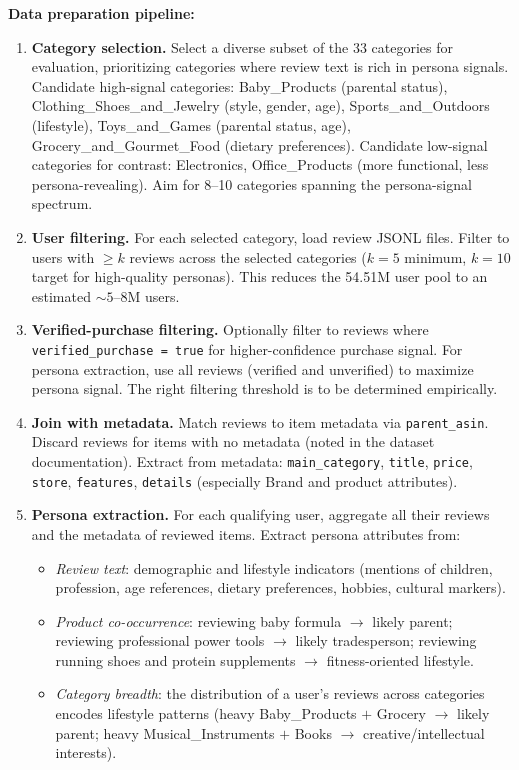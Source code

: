 \medskip\noindent\textbf{Data preparation pipeline:}
\begin{enumerate}
    \item \textbf{Category selection.} Select a diverse subset of the 33 categories for evaluation, prioritizing categories where review text is rich in persona signals. Candidate high-signal categories: Baby\_Products (parental status), Clothing\_Shoes\_and\_Jewelry (style, gender, age), Sports\_and\_Outdoors (lifestyle), Toys\_and\_Games (parental status, age), Grocery\_and\_Gourmet\_Food (dietary preferences). Candidate low-signal categories for contrast: Electronics, Office\_Products (more functional, less persona-revealing). Aim for 8--10 categories spanning the persona-signal spectrum.
    \item \textbf{User filtering.} For each selected category, load review JSONL files. Filter to users with $\geq k$ reviews across the selected categories ($k = 5$ minimum, $k = 10$ target for high-quality personas). This reduces the 54.51M user pool to an estimated ${\sim}5$--8M users.
    \item \textbf{Verified-purchase filtering.} Optionally filter to reviews where \texttt{verified\_purchase = true} for higher-confidence purchase signal. For persona extraction, use all reviews (verified and unverified) to maximize persona signal. The right filtering threshold is to be determined empirically.
    \item \textbf{Join with metadata.} Match reviews to item metadata via \texttt{parent\_asin}. Discard reviews for items with no metadata (noted in the dataset documentation). Extract from metadata: \texttt{main\_category}, \texttt{title}, \texttt{price}, \texttt{store}, \texttt{features}, \texttt{details} (especially Brand and product attributes).
    \item \textbf{Persona extraction.} For each qualifying user, aggregate all their reviews and the metadata of reviewed items. Extract persona attributes from:
    \begin{itemize}
        \item \emph{Review text}: demographic and lifestyle indicators (mentions of children, profession, age references, dietary preferences, hobbies, cultural markers).
        \item \emph{Product co-occurrence}: reviewing baby formula $\to$ likely parent; reviewing professional power tools $\to$ likely tradesperson; reviewing running shoes and protein supplements $\to$ fitness-oriented lifestyle.
        \item \emph{Category breadth}: the distribution of a user's reviews across categories encodes lifestyle patterns (heavy Baby\_Products $+$ Grocery $\to$ likely parent; heavy Musical\_Instruments $+$ Books $\to$ creative/intellectual interests).

\end{itemize}
\end{enumerate}
